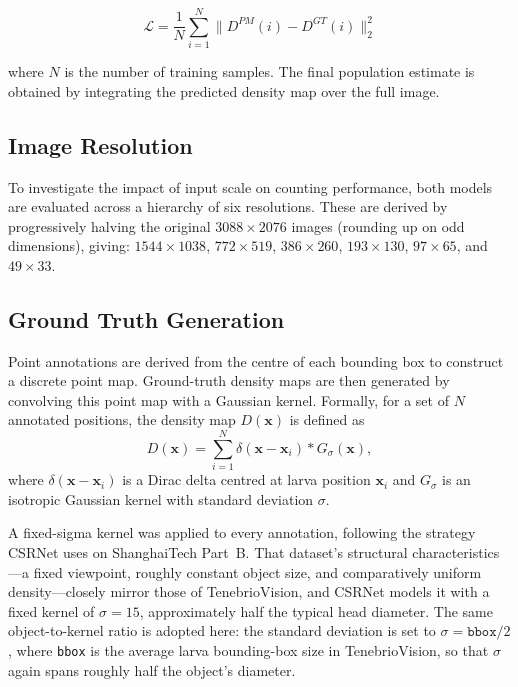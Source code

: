 \documentclass[conference]{IEEEtran}
\begin{document}
\begin{equation}
    \mathcal{L} = \frac{1}{N} \sum_{i=1}^{N} \| D^{PM}(i) - D^{GT}(i) \|_2^2
\end{equation}

where $N$ is the number of training samples. The final population estimate is obtained by integrating the predicted density map over the full image. \cite{wang2020mobilecount, li2018csrnet}

\subsection{Image Resolution}
To investigate the impact of input scale on counting performance, both models are evaluated across a hierarchy of six resolutions. These are derived by progressively halving the original $3088 \times 2076$ images (rounding up on odd dimensions), giving: $1544 \times 1038$, $772 \times 519$, $386 \times 260$, $193 \times 130$, $97 \times 65$, and $49 \times 33$.

\subsection{Ground Truth Generation}
Point annotations are derived from the centre of each bounding box to construct
a discrete point map. Ground-truth density maps are then generated by convolving
this point map with a Gaussian kernel. Formally, for a set of $N$ annotated
positions, the density map $D(\mathbf{x})$ is defined as
\begin{equation}
    D(\mathbf{x}) = \sum_{i=1}^{N} \delta(\mathbf{x} - \mathbf{x}_i) *
    G_{\sigma}(\mathbf{x}),
\end{equation}
where $\delta(\mathbf{x} - \mathbf{x}_i)$ is a Dirac delta centred at larva
position $\mathbf{x}_i$ and $G_{\sigma}$ is an isotropic Gaussian kernel with
standard deviation $\sigma$.

A fixed-sigma kernel was applied to every annotation, following the strategy
CSRNet uses on ShanghaiTech Part~B. That dataset's structural
characteristics---a fixed viewpoint, roughly constant object size, and
comparatively uniform density---closely mirror those of TenebrioVision, and
CSRNet models it with a fixed kernel of $\sigma = 15$, approximately half the
typical head diameter. The same object-to-kernel ratio is adopted here: the standard
deviation is set to $\sigma = \texttt{bbox}/2$, where \texttt{bbox} is the
average larva bounding-box size in TenebrioVision, so that $\sigma$ again spans
roughly half the object's diameter.
\end{document}
